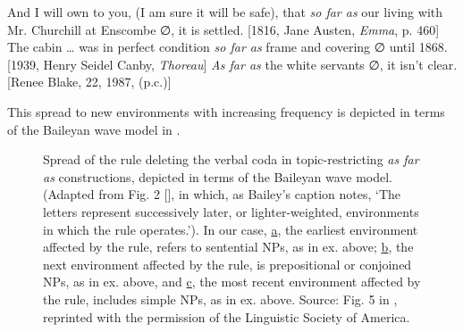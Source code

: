 \documentclass[output=paper,colorlinks,citecolor=brown]{langscibook}
\begin{document}
\ea
\label{ex 3:rickford:3}
And I will own to you, (I am sure it will be safe), that \textit{so far as} our living with Mr. Churchill at Enscombe ∅, it is settled. [1816, Jane Austen, \textit{Emma}, p. 460]
\ex
\label{ex 4:rickford:4}
The cabin … was in perfect condition \textit{so far as} frame and covering ∅ until 1868. [1939, Henry Seidel Canby, \textit{Thoreau}]
\ex
\label{ex 5:rickford:5}  
\textit{As far as} the white servants ∅, it isn’t clear. [Renee Blake, 22, 1987, (p.c.)] 
\z 
 

This spread to new environments with increasing frequency is depicted in terms of the Baileyan wave model in .
 
\begin{figure}[t]

\caption{Spread of the rule deleting the verbal coda in topic-restricting \textit{as far as} constructions, depicted in terms of the Baileyan wave model.  (Adapted from Fig. 2 [\citealt[68]{Bailey1973}], in which, as Bailey’s caption notes, ‘The letters represent successively later, or lighter-weighted, environments in which the rule operates.’).  In our case, \underline{a}, the earliest environment affected by the rule, refers to sentential NPs, as in ex.  above; \underline{b}, the next environment affected by the rule, is prepositional or conjoined NPs, as in ex.  above, and \underline{c}, the most recent environment affected by the rule, includes simple NPs, as in ex.  above.  Source: Fig. 5 in \citep{RickfordEspinoza1995}, reprinted with the permission of the Linguistic Society of America.}
\label{fig:rickford:1}
\end{figure}
\end{document}
